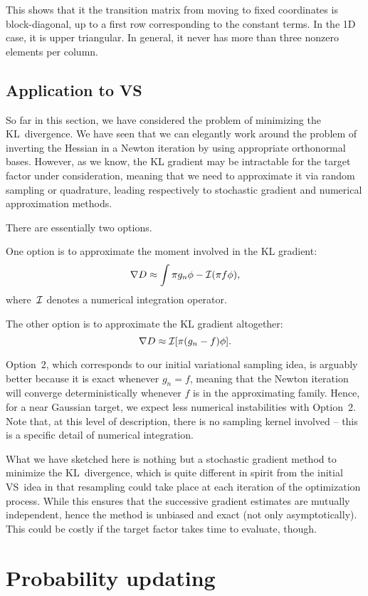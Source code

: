 \documentclass{article}
\begin{document}
This shows that it the transition matrix from moving to fixed coordinates is block-diagonal, up to a first row corresponding to the constant terms. In the 1D case, it is upper triangular. In general, it never has more than three nonzero elements per column.




\subsection{Application to VS}

So far in this section, we have considered the problem of minimizing the KL~divergence. We have seen that we can elegantly work around the problem of inverting the Hessian in a Newton iteration by using appropriate orthonormal bases. However, as we know, the KL gradient may be intractable for the target factor under consideration, meaning that we need to approximate it via random sampling or quadrature, leading respectively to stochastic gradient and numerical approximation methods.

There are essentially two options.

One option is to approximate the moment involved in the KL gradient:
$$
\nabla D \approx \int \pi g_n\phi - {\cal I}(\pi f \phi),
$$
where~${\cal I}$ denotes a numerical integration operator.

The other option is to approximate the KL gradient altogether:
$$
\nabla D \approx {\cal I}[\pi(g_n - f)\phi].
$$

Option~2, which corresponds to our initial variational sampling idea, is arguably better because it is exact whenever $g_n=f$, meaning that the Newton iteration will converge deterministically whenever $f$ is in the approximating family. Hence, for a near Gaussian target, we expect less numerical instabilities with Option~2. Note that, at this level of description, there is no sampling kernel involved -- this is a specific detail of numerical integration.

What we have sketched here is nothing but a stochastic gradient method to minimize the KL~divergence, which is quite different in spirit from the initial VS~idea in that resampling could take place at each iteration of the optimization process. While this ensures that the successive gradient estimates are mutually independent, hence the method is unbiased and exact (not only asymptotically). This could be costly if the target factor takes time to evaluate, though. 


\section{Probability updating}
\end{document}
